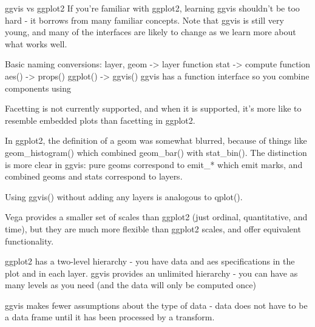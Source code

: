 ggvis vs ggplot2
If you’re familiar with ggplot2, learning ggvis shouldn’t be too hard - it borrows from many familiar concepts. Note that ggvis is still very young, and many of the interfaces are likely to change as we learn more about what works well.

Basic naming conversions:
layer, geom -> layer function
stat -> compute function
aes() -> props()
ggplot() -> ggvis()
ggvis has a function interface so you combine components using %

Facetting is not currently supported, and when it is supported, it’s more like to resemble embedded plots than facetting in ggplot2.

In ggplot2, the definition of a geom was somewhat blurred, because of things like geom_histogram() which combined geom_bar() with stat_bin(). The distinction is more clear in ggvis: pure geoms correspond to emit_* which emit marks, and combined geoms and stats correspond to layers.

Using ggvis() without adding any layers is analogous to qplot().

Vega provides a smaller set of scales than ggplot2 (just ordinal, quantitative, and time), but they are much more flexible than ggplot2 scales, and offer equivalent functionality.

ggplot2 has a two-level hierarchy - you have data and aes specifications in the plot and in each layer. ggvis provides an unlimited hierarchy - you can have as many levels as you need (and the data will only be computed once)

ggvis makes fewer assumptions about the type of data - data does not have to be a data frame until it has been processed by a transform.
